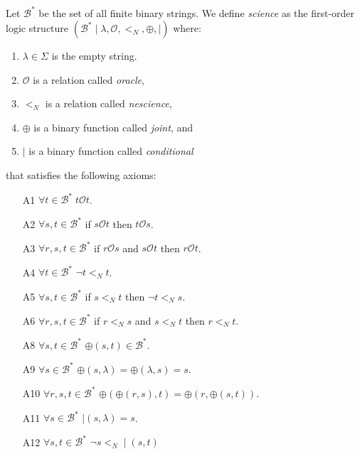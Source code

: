 \begin{definition}

Let $\mathcal{B}^\ast$ be the set of all finite binary strings. We define \emph{science} as the first-order logic structure $(\mathcal{B}^\ast \mid \lambda, \mathcal{O}, <_N, \oplus, \mid)$ where:

\vskip 0.25cm

\begin{enumerate}[label=(\roman*)]
\item $\lambda \in \Sigma$ is the empty string.
\item $\mathcal{O}$ is a relation called \emph{oracle},
\item $<_N$ is a relation called \emph{nescience},
\item $\oplus$ is a binary function called \emph{joint}, and
\item $\mid$ is a binary function called \emph{conditional}
\end{enumerate}

\vskip 0.25cm

that satisfies the following axioms:

\vskip 0.25cm

\begin{itemize}

\item[A1] $\forall t \in \mathcal{B}^\ast \; t \mathcal{O} t$.
\item[A2] $\forall s , t \in \mathcal{B}^\ast$ if $s \mathcal{O} t$ then $t \mathcal{O} s$.
\item[A3] $\forall r, s , t \in \mathcal{B}^\ast$ if $r \mathcal{O} s$ and $s \mathcal{O} t$ then $r \mathcal{O} t$.

\vskip 0.25cm

\item[A4] $\forall t \in \mathcal{B}^\ast$ $\lnot t <_N t$.
\item[A5] $\forall s , t \in \mathcal{B}^\ast$ if $s <_N t$ then $\lnot t <_N s$.
\item[A6] $\forall r , s, t \in \mathcal{B}^\ast$ if $r <_N s$ and $s <_N t$ then $r <_N t$.

\vskip 0.25cm

\item[A8] $\forall s, t \in \mathcal{B}^\ast$ $\oplus(s, t) \in \mathcal{B}^\ast$.
\item[A9] $\forall s \in \mathcal{B}^\ast$ $\oplus(s, \lambda) = \oplus( \lambda, s) = s$.
\item[A10] $\forall r, s, t \in \mathcal{B}^\ast$ $\oplus(\oplus(r, s), t) = \oplus(r, \oplus(s, t))$.

\vskip 0.25cm

\item[A11] $\forall s \in \mathcal{B}^\ast$ $\mid (s, \lambda) = s$.
\item[A12] $\forall s, t \in \mathcal{B}^\ast$ $\lnot s <_N \mid (s, t)$

\end{itemize}

\end{definition}

